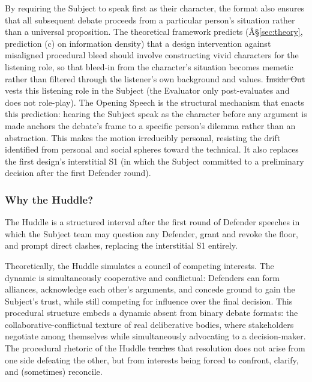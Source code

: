 \documentclass[12pt]{article}
\makeatletter
\providecommand{\DIFaddtex}[1]{{\protect\color[rgb]{0,0.5,0}\uwave{#1}}} %
\providecommand{\DIFdeltex}[1]{{\protect\color{red}\sout{#1}}} %
\providecommand{\DIFaddbegin}{} %
\providecommand{\DIFaddend}{} %
\providecommand{\DIFdelbegin}{} %
\providecommand{\DIFdelend}{} %
\providecommand{\DIFadd}[1]{\texorpdfstring{\DIFaddtex{#1}}{#1}} %
\providecommand{\DIFdel}[1]{\texorpdfstring{\DIFdeltex{#1}}{}} %
\providecommand{\DIFscaledelfig}{0.5}
\newlength{\DIFdelgraphicswidth} %
\newlength{\DIFdelgraphicsheight} %
\providecommand{\DIFaddincludegraphics}[2][]{{\color[rgb]{0,0.5,0}\fbox{\DIFOincludegraphics[#1]{#2}}}} %
\providecommand{\DIFdelincludegraphics}[2][]{%
\sbox{\DIFdelgraphicsbox}{\DIFOincludegraphics[#1]{#2}}%
\settoboxwidth{\DIFdelgraphicswidth}{\DIFdelgraphicsbox} %
\settoboxtotalheight{\DIFdelgraphicsheight}{\DIFdelgraphicsbox} %
\scalebox{\DIFscaledelfig}{%
\parbox[b]{\DIFdelgraphicswidth}{\usebox{\DIFdelgraphicsbox}\\[-\baselineskip] \rule{\DIFdelgraphicswidth}{0em}}\llap{\resizebox{\DIFdelgraphicswidth}{\DIFdelgraphicsheight}{%
\setlength{\unitlength}{\DIFdelgraphicswidth}%
\begin{picture}(1,1)%
\thicklines\linethickness{2pt} %
{\color[rgb]{1,0,0}\put(0,0){\framebox(1,1){}}}%
{\color[rgb]{1,0,0}\put(0,0){\line( 1,1){1}}}%
{\color[rgb]{1,0,0}\put(0,1){\line(1,-1){1}}}%
\end{picture}%
}\hspace*{3pt}}} %
} %
\DeclareRobustCommand{\DIFaddbegin}{\DIFOaddbegin \let\includegraphics\DIFaddincludegraphics} %
\DeclareRobustCommand{\DIFaddend}{\DIFOaddend \let\includegraphics\DIFOincludegraphics} %
\DeclareRobustCommand{\DIFdelbegin}{\DIFOdelbegin \let\includegraphics\DIFdelincludegraphics} %
\DeclareRobustCommand{\DIFdelend}{\DIFOaddend \let\includegraphics\DIFOincludegraphics} %
\let\sout@orig\sout %
\renewcommand{\sout}[1]{\ifmmode\text{\sout@orig{\ensuremath{#1}}}\else\sout@orig{#1}\fi} %
\makeatother
\begin{document}
By requiring the Subject to speak first as their character, the format also ensures that all subsequent debate proceeds from a particular person's situation rather than a universal proposition. The theoretical framework predicts (Â§\ref{sec:theory}, prediction (c) on information density) that a design intervention against misaligned procedural bleed should involve constructing vivid characters for the listening role, so that bleed-in from the character's situation becomes memetic rather than filtered through the listener's own background and values. \DIFdelbegin \DIFdel{Inside Out }\DIFdelend \DIFaddbegin \emph{\DIFadd{Inside Out}} \DIFaddend vests this listening role in the Subject (the Evaluator only post-evaluates and does not role-play). The Opening Speech is the structural mechanism that enacts this prediction: hearing the Subject speak as the character before any argument is made anchors the debate's frame to a specific person's dilemma rather than an abstraction. This makes the motion irreducibly personal, resisting the drift \textcite{goodnight1982spheres} identified from personal and social spheres toward the technical. It also replaces the first design's interstitial S1 (in which the Subject committed to a preliminary decision after the first Defender round).

\subsubsection{Why the Huddle?}

The Huddle is a structured interval after the first round of Defender speeches in which the Subject team may question any Defender, grant and revoke the floor, and prompt direct clashes, replacing the interstitial S1 entirely.

Theoretically, the Huddle simulates a council of competing interests. The dynamic is simultaneously cooperative and conflictual: Defenders can form alliances, acknowledge each other's arguments, and concede ground to gain the Subject's trust, while still competing for influence over the final decision. This procedural structure embeds a dynamic absent from binary debate formats: the collaborative-conflictual texture of real deliberative bodies, where stakeholders negotiate among themselves while simultaneously advocating to a decision-maker. The procedural rhetoric of the Huddle \DIFdelbegin \DIFdel{teaches }\DIFdelend \DIFaddbegin \DIFadd{is intended to teach }\DIFaddend that resolution does not arise from one side defeating the other, but from interests being forced to confront, clarify, and (sometimes) reconcile.
\end{document}
